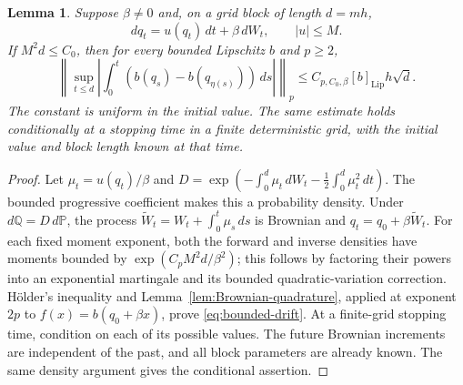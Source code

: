 \documentclass[11pt]{article}
\newtheorem{lemma}[theorem]{Lemma}
\theoremstyle{remark}
\newcommand{\abs}[1]{\lvert#1\rvert}
\begin{document}
\begin{lemma}\label{lem:bounded-drift}
Suppose \(\beta\ne0\) and, on a grid block of length \(d=mh\),
\[
 dq_t=u(q_t)\,dt+\beta\,dW_t,\qquad \abs u\le M.
\]
If \(M^2d\le C_0\), then for every bounded Lipschitz \(b\) and \(p\ge2\),
\begin{equation}\label{eq:bounded-drift}
 \left\|\sup_{t\le d}\left|
   \int_0^t(b(q_s)-b(q_{\eta(s)}))\,ds\right|\right\|_p
 \le C_{p,C_0,\beta}[b]_{\mathrm{Lip}}h\sqrt d .
\end{equation}
The constant is uniform in the initial value. The same estimate holds
conditionally at a stopping time in a finite deterministic grid, with
the initial value and block length known at that time.
\end{lemma}
\begin{proof}
Let \(\mu_t=u(q_t)/\beta\) and
\(D=\exp(-\int_0^d\mu_t\,dW_t-\tfrac12\int_0^d\mu_t^2\,dt)\).
The bounded progressive coefficient makes this a probability density.
Under \(d\mathbb Q=D\,d\mathbb P\), the process
\(\widetilde W_t=W_t+\int_0^t\mu_s\,ds\) is Brownian and
\(q_t=q_0+\beta\widetilde W_t\).
For each fixed moment exponent, both the forward and inverse densities
have moments bounded by \(\exp(C_pM^2d/\beta^2)\); this follows by
factoring their powers into an exponential martingale and its
bounded quadratic-variation correction.
H\"older's inequality and Lemma~\ref{lem:Brownian-quadrature},
applied at exponent \(2p\) to \(f(x)=b(q_0+\beta x)\), prove
\eqref{eq:bounded-drift}.
At a finite-grid stopping time, condition on each of its possible
values. The future Brownian increments are independent of the past,
and all block parameters are already known. The same density argument
gives the conditional assertion.
\end{proof}
\end{document}
